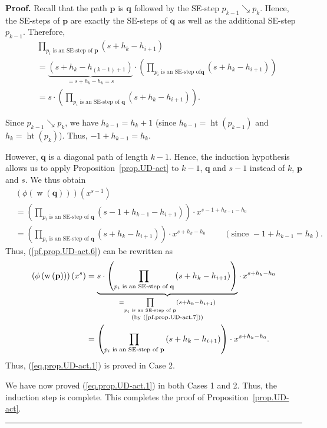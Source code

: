 \documentclass[numbers=enddot,12pt,final,onecolumn,notitlepage]{scrartcl}%
\theoremstyle{definition}
\newenvironment{proof}[1][Proof]{\noindent\textbf{#1.} }{\ \rule{0.5em}{0.5em}}
\newcommand{\pp}{\mathbf{p}}
\newcommand{\qq}{\mathbf{q}}
\newcommand{\w}{\operatorname{w}}
\newcommand{\htt}{\operatorname{ht}}
\newenvironment{verlong}{}{}
\begin{document}
\begin{verlong}
\begin{proof}
Recall that the path $\pp$ is $\qq$ followed by the SE-step
$p_{k-1}\searrow p_{k}$. Hence, the SE-steps of $\pp$ are exactly the
SE-steps of $\qq$ as well as the additional SE-step $p_{k-1}$.
Therefore,%
\begin{align}
&  \prod_{p_{i}\text{ is an SE-step of }\pp}\left(  s+h_{k}%
-h_{i+1}\right) \nonumber\\
&  =\underbrace{\left(  s+h_{k}-h_{\left(  k-1\right)  +1}\right)  }%
_{=s+h_{k}-h_{k}=s}\cdot\left(  \prod_{p_{i}\text{ is an SE-step of
}\qq}\left(  s+h_{k}-h_{i+1}\right)  \right) \nonumber\\
&  =s\cdot\left(  \prod_{p_{i}\text{ is an SE-step of }\qq}\left(
s+h_{k}-h_{i+1}\right)  \right)  . \label{pf.prop.UD-act.7}%
\end{align}


Since $p_{k-1}\searrow p_{k}$, we have $h_{k-1}=h_{k}+1$ (since $h_{k-1}%
=\htt\left(  p_{k-1}\right)  $ and $h_{k}=\htt%
\left(  p_{k}\right)  $). Thus, $-1+h_{k-1}=h_{k}$.

However, $\qq$ is a diagonal path of length $k-1$. Hence, the induction
hypothesis allows us to apply Proposition~\ref{prop.UD-act} to $k-1$,
$\qq$ and $s-1$ instead of $k$, $\pp$ and $s$. We thus obtain%
\begin{align*}
&  \left(  \phi\left(  \w\left(  \qq\right)  \right)
\right)  \left(  x^{s-1}\right)  \\
&  =\left(  \prod_{p_{i}\text{ is an SE-step of }\qq}\left(
s-1+h_{k-1}-h_{i+1}\right)  \right)  \cdot x^{s-1+h_{k-1}-h_{0}}\\
&  =\left(  \prod_{p_{i}\text{ is an SE-step of }\qq}\left(
s+h_{k}-h_{i+1}\right)  \right)  \cdot x^{s+h_{k}-h_{0}}%
\ \ \ \ \ \ \ \ \ \ \left(  \text{since }-1+h_{k-1}=h_{k}\right)  .
\end{align*}
Thus, (\ref{pf.prop.UD-act.6}) can be rewritten as%
\begin{align*}
\left(  \phi\left(  \w\left(  \pp\right)  \right)
\right)  \left(  x^{s}\right)   &  =\underbrace{s\cdot\left(  \prod
_{p_{i}\text{ is an SE-step of }\qq}\left(  s+h_{k}-h_{i+1}\right)
\right)  }_{\substack{=\prod\limits_{p_{i}\text{ is an SE-step of }\pp}\left(
s+h_{k}-h_{i+1}\right)  \\\text{(by (\ref{pf.prop.UD-act.7}))}}}\cdot
\,x^{s+h_{k}-h_{0}}\\
&  =\left(  \prod_{p_{i}\text{ is an SE-step of }\pp}\left(
s+h_{k}-h_{i+1}\right)  \right)  \cdot x^{s+h_{k}-h_{0}}.
\end{align*}
Thus, (\ref{eq.prop.UD-act.1}) is proved in Case 2.

We have now proved (\ref{eq.prop.UD-act.1}) in both Cases 1 and 2. Thus, the
induction step is complete. This completes the proof of
Proposition~\ref{prop.UD-act}.
\end{proof}
\end{verlong}
\end{document}
